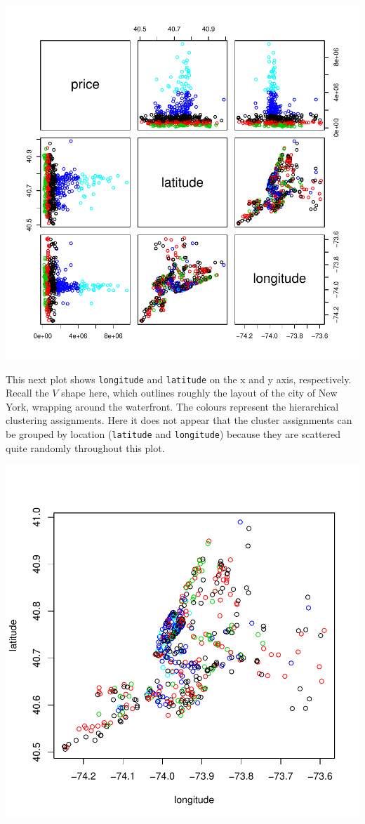 \documentclass[11pt, a4paper]{article}
\begin{document}
\includegraphics{project_report-012}

This next plot shows \texttt{longitude} and \texttt{latitude} on the x and y axis, respectively. Recall the $V$ shape here, which outlines roughly the layout of the city of New York, wrapping around the waterfront. The colours represent the hierarchical clustering assignments. Here it does not appear that the cluster assignments can be grouped by location (\texttt{latitude} and \texttt{longitude}) because they are scattered quite randomly throughout this plot.

\includegraphics{project_report-013}
\end{document}
